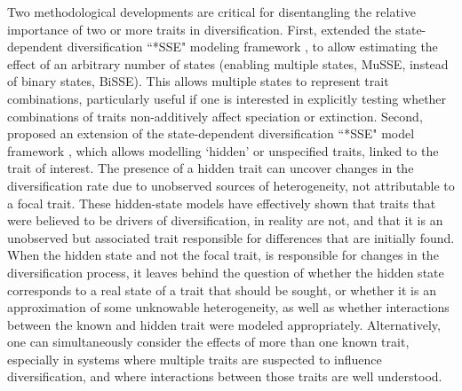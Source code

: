 Two methodological developments are critical for disentangling the relative importance of two or more traits in diversification.
First, \citet{fitzjohn_2012} extended the state-dependent diversification ``*SSE" modeling framework \citep{maddison_2007}, to allow estimating the effect of an arbitrary number of states (enabling multiple states, MuSSE, instead of binary states, BiSSE).
This allows multiple states to represent trait combinations, particularly useful if one is interested in explicitly testing whether combinations of traits non-additively affect speciation or extinction.
Second, \citet{beaulieu_2016} proposed an extension of the state-dependent diversification ``*SSE" model framework \citep{maddison_2007}, which allows modelling `hidden' or unspecified traits, linked to the trait of interest.
The presence of a hidden trait can uncover changes in the diversification rate due to unobserved sources of heterogeneity, not attributable to a focal trait.
These hidden-state  models have effectively shown that traits that were believed to be drivers of diversification, in reality are not, and that it is an unobserved but associated trait responsible for differences that are initially found. 
When the hidden state and not the focal trait, is responsible for changes in the diversification process, it leaves behind the question of whether the hidden state corresponds to a real state of a trait that should be sought, or whether it is an approximation of some unknowable heterogeneity, as well as whether interactions between the known and hidden trait were modeled appropriately.
Alternatively, one can simultaneously consider the effects of more than one known trait, especially in systems where multiple traits are suspected to influence diversification, and where interactions between those traits are well understood.

